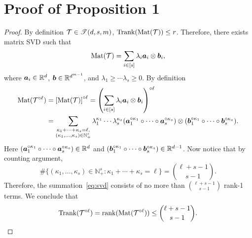 \documentclass[11pt]{article}
\theoremstyle{plain}
\theoremstyle{definition}
\def\rank{\textup{Trank}}
\def\Mat{\textup{Mat}}
\def\caliT{\large\mathscr{T}}
\begin{document}
\section{Proof of Proposition 1}
\begin{proof}
By definition $\tT\in\caliT(d,s,m)$, $\rank(\Mat(\tT))\leq r$. Therefore, there exists matrix SVD such that
\[
\Mat(\tT)=\sum_{i\in[s]} \lambda_i\ma_i\otimes \mb_i,
\]
where $\bm{a}_i\in\mathbb{R}^d$, $\bm{b}\in\mathbb{R}^{d^{m-1}}$, and $\lambda_1\geq \cdots \lambda_s\geq 0$. By definition
\begin{align}\label{eq:svd}
\Mat(\tT^{\circ \ell})&=\left[\Mat(\tT)\right]^{\circ \ell}=\left(\sum_{i\in[s]}\lambda_i\ma_i\otimes \mb_i\right)^{\circ \ell}\\
&=\sum_{\substack{\kappa_1+\cdots+\kappa_s=\ell,\\ (\kappa_1,\ldots,\kappa_s)\in\mathbb{N}^s_{+}}}\lambda^{\kappa_1}_1\cdots\lambda^{\kappa_s}_s(\ma^{\circ \kappa_1}_1\circ \cdots \circ \ma^{\circ \kappa_s}_s)\otimes(\mb^{\circ \kappa_1}_1\circ \cdots \circ \mb^{\circ \kappa_s}_s).
\end{align}
Here $(\bm{a}^{\circ \kappa_1}_1\circ \cdots \circ \bm{a}^{\circ \kappa_s}_s) \in\mathbb{R}^{d}$ and $(\bm{b}^{\circ \kappa_1}_1\circ \cdots \circ \bm{b}^{\circ \kappa_s}_s)\in\mathbb{R}^{d-1}$. Now notice that by counting argument, 
\[
\#\{(\kappa_1,\ldots,\kappa_s) \in \mathbb{N}_{+}^{s} \colon \kappa_1+\cdots+\kappa_s=\ell\} = {\ell+s-1 \choose s-1}.
\]
Therefore, the summation~\eqref{eq:svd} consists of no more than ${\ell+s-1 \choose s-1}$ rank-1 terms. We conclude that
\[
\rank(\tT^{\circ \ell})=\text{rank}(\Mat(\tT^{\circ \ell}))\leq  {\ell+s-1 \choose s-1}.
\]
\end{proof}
\end{document}
